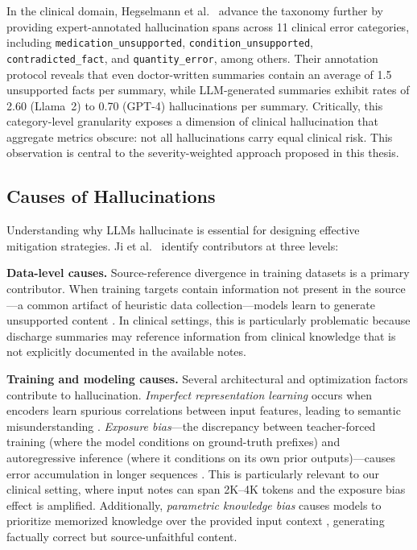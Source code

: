 \documentclass[12pt,a4paper,oneside]{report}
\begin{document}
In the clinical domain, Hegselmann et al.~\cite{hegselmann2024datacentric} advance the taxonomy further by providing expert-annotated hallucination spans across 11 clinical error categories, including \texttt{medication\_unsupported}, \texttt{condition\_unsupported}, \texttt{contradicted\_fact}, and \texttt{quantity\_error}, among others. Their annotation protocol reveals that even doctor-written summaries contain an average of 1.5 unsupported facts per summary, while LLM-generated summaries exhibit rates of 2.60 (Llama~2) to 0.70 (GPT-4) hallucinations per summary. Critically, this category-level granularity exposes a dimension of clinical hallucination that aggregate metrics obscure: not all hallucinations carry equal clinical risk. This observation is central to the severity-weighted approach proposed in this thesis.


\subsection{Causes of Hallucinations}
\label{subsec:hallucination-causes}

Understanding why LLMs hallucinate is essential for designing effective mitigation strategies. Ji et al.~\cite{ji2023hallucination} identify contributors at three levels:

\textbf{Data-level causes.} Source-reference divergence in training datasets is a primary contributor. When training targets contain information not present in the source---a common artifact of heuristic data collection---models learn to generate unsupported content \cite{ji2023hallucination}. In clinical settings, this is particularly problematic because discharge summaries may reference information from clinical knowledge that is not explicitly documented in the available notes.

\textbf{Training and modeling causes.} Several architectural and optimization factors contribute to hallucination. \textit{Imperfect representation learning} occurs when encoders learn spurious correlations between input features, leading to semantic misunderstanding \cite{ji2023hallucination}. \textit{Exposure bias}---the discrepancy between teacher-forced training (where the model conditions on ground-truth prefixes) and autoregressive inference (where it conditions on its own prior outputs)---causes error accumulation in longer sequences \cite{ji2023hallucination}. This is particularly relevant to our clinical setting, where input notes can span 2K--4K tokens and the exposure bias effect is amplified. Additionally, \textit{parametric knowledge bias} causes models to prioritize memorized knowledge over the provided input context \cite{longpre2021entity}, generating factually correct but source-unfaithful content.
\end{document}
